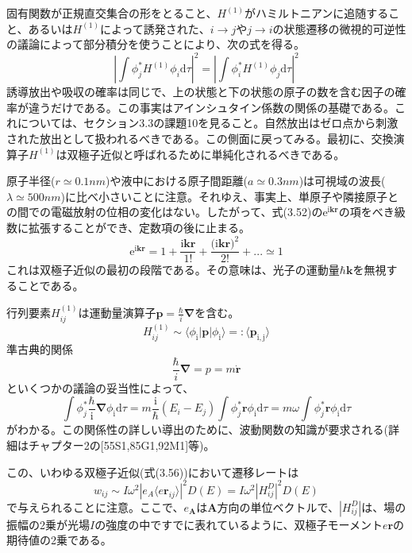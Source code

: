 \documentclass[11pt,a4j,uplatex]{jsarticle}
\begin{document}
固有関数が正規直交集合の形をとること、$H^{(1)}$がハミルトニアンに追随すること、あるいは$H^{(1)}$によって誘発された、$i\to j$や$j\to i$の状態遷移の微視的可逆性の議論によって部分積分を使うことにより、次の式を得る。
\begin{equation}
  \left|\int\phi_j^*H^{(1)}\phi_i\mathrm{d}\tau\right|^2=\left|\int\phi_i^*H^{(1)}\phi_j\mathrm{d}\tau\right|^2\tag{3.55}
\end{equation}
誘導放出や吸収の確率は同じで、上の状態と下の状態の原子の数を含む因子の確率が違うだけである。この事実はアインシュタイン係数の関係の基礎である。これについては、セクション3.3の課題10を見ること。自然放出はゼロ点から刺激された放出として扱われるべきである。この側面に戻ってみる。最初に、交換演算子$H^{(1)}$は双極子近似と呼ばれるために単純化されるべきである。

原子半径($r\simeq0.1 nm$)や液中における原子間距離($a\simeq0.3 nm$)は可視域の波長($\lambda\simeq500 nm$)に比べ小さいことに注意。それゆえ、事実上、単原子や隣接原子との間での電磁放射の位相の変化はない。したがって、式(3.52)の$\mathrm{e}^{\mathrm{i}\bm{kr}}$の項をべき級数に拡張することができ、定数項の後に止まる。
\begin{equation}
  \mathrm{e}^{\mathrm{i}\bm{kr}}=1+\frac{\mathrm{i}\bm{kr}}{1!}+\frac{{(\mathrm{i}\bm{kr}})^2}{2!}+...\simeq1\tag{3.56}
\end{equation}
これは双極子近似の最初の段階である。その意味は、光子の運動量$\hbar\bm{k}$を無視することである。

行列要素$H_{ij}^{(1)}$は運動量演算子$\bm{p}=\frac{\hbar}{i}\bm{\nabla}$を含む。
\begin{equation}
  H_{ij}^{(1)}\sim\langle\phi_{\mathrm{i}}\left|\bm{p}\right|\phi_{\mathrm{i}}\rangle=:\langle\bm{p}_{\mathrm{i,j}}\rangle
  \nonumber
\end{equation}
準古典的関係
\begin{equation}
  \frac{\hbar}{i}\bm{\nabla}=p=m\dot{\bm{r}}\tag{3.57}
\end{equation}
といくつかの議論の妥当性によって、
\begin{equation}
  \int\phi_j^*\frac{\hbar}{\mathrm{i}}\bm{\nabla}\phi_{\mathrm{i}}\mathrm{d}\tau=m\frac{\mathrm{i}}{\hbar}(E_i-E_j)\int\phi_j^*\bm{r}\phi_{\mathrm{i}}\mathrm{d}\tau=m\omega\int\phi_j^*\bm{r}\phi_{\mathrm{i}}\mathrm{d}\tau\tag{3.58}
\end{equation}
がわかる。この関係性の詳しい導出のために、波動関数の知識が要求される(詳細はチャプター2の[55S1,85G1,92M1]等)。

この、いわゆる双極子近似(式(3.56))において遷移レートは
\begin{equation}
  w_{ij}\sim I\omega^2\left|e_A\langle e\bm{r}_{ij}\rangle\right|^2D(E)=I\omega^2\left|H_{ij}^D\right|^2D(E)\tag{3.59}
\end{equation}
で与えられることに注意。ここで、$e_{\bm{A}}$は$\bm{A}$方向の単位ベクトルで、$\left|H_{ij}^D\right|$は、場の振幅の2乗が光場$I$の強度の中ですでに表れているように、双極子モーメント$e\bm{r}$の期待値の2乗である。
\end{document}
